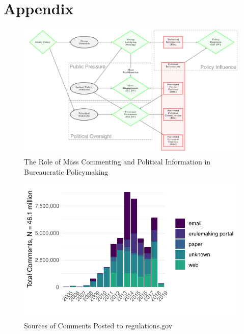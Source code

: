 \documentclass[
      12pt,
        ]{article}
\begin{document}
\newpage

\hypertarget{appendix-appendix}{%
\appendix}


\hypertarget{appendix}{%
\section*{Appendix}\label{appendix}}

\begin{figure}

{\centering \includegraphics[width=6.5in]{../Figs/causal-full} 

}

\caption{The Role of Mass Commenting and Political Information in Bureaucratic Policymaking}\label{fig:causal-full}
\end{figure}

\begin{figure}

{\centering \includegraphics[width=6.5in]{../Figs/comments-from} 

}

\caption{Sources of Comments Posted to regulations.gov}\label{fig:comments-from}
\end{figure}
\end{document}
